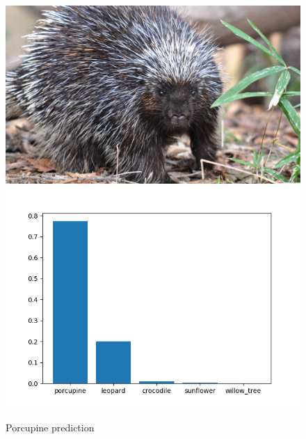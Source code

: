 \documentclass[12pt,english]{article}
\begin{document}
\begin{figure}[H]
\centering
\includegraphics[scale=0.35]{porcupine.jpg}
\includegraphics[scale=0.75]{porcupine_prediction.png}
\caption{Porcupine prediction}
\end{figure}
\end{document}
